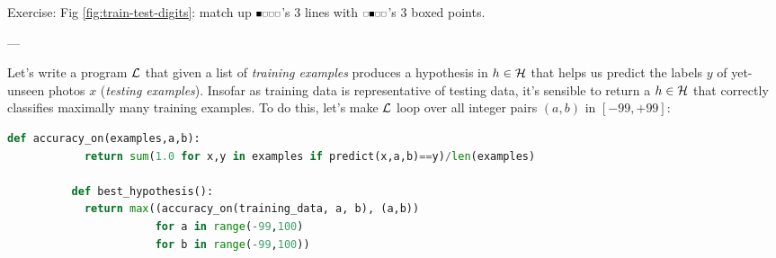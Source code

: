 \documentclass[11pt, justified]{tufte-book}
\newcommand{\offourline}[1]{
    {\tiny \raisebox{0.04cm}{\scalebox{0.9}{$\substack{
        \IfSubStr{#1}{0}{{\blacksquare}}{\square}   
        \IfSubStr{#1}{1}{{\blacksquare}}{\square}
        \IfSubStr{#1}{2}{{\blacksquare}}{\square}   
        \IfSubStr{#1}{3}{{\blacksquare}}{\square}   
    }$}}}%
}
\newcommand{\attn}[1]{{\bro \textsf{#1}}}
\newcommand{\plainfootprint}{}
\newcommand{\footprint}{\marginnote{\plainfootprint} }
\newcommand{\samsubsubsection}[1]{
   \vspace{0.1cm}
   \par\noindent{\hspace{-2cm}\normalsize \sc \gre #1} ---
}
\theoremstyle{definition}
\begin{document}
        \noindent
        \attn{Exercise:} {Fig \ref{fig:train-test-digits}: match up $\offourline{0}$'s $3$ lines with
        $\offourline{1}$'s $3$ boxed points.}\footprint

      \samsubsubsection{optimization}
        Let's write a program $\mathcal{L}$ that given a list of \emph{training
        examples} produces a hypothesis in $h \in \mathcal{H}$ that helps us predict
        the labels $y$ of yet-unseen photos $x$ (\emph{testing examples}).
        Insofar as training data is representative of testing data, it's
        sensible to return a $h\in \mathcal{H}$ that correctly classifies maximally
        many training examples.\footprint
        To do this, let's make $\mathcal{L}$ loop over all integer pairs $(a,b)$ in
        $[-99,+99]$:  %
        \begin{lstlisting}[language=Python, basicstyle=\footnotesize\ttfamily]
          def accuracy_on(examples,a,b):
            return sum(1.0 for x,y in examples if predict(x,a,b)==y)/len(examples)

          def best_hypothesis():
            return max((accuracy_on(training_data, a, b), (a,b))
                       for a in range(-99,100) 
                       for b in range(-99,100))
        \end{lstlisting}
\end{document}

